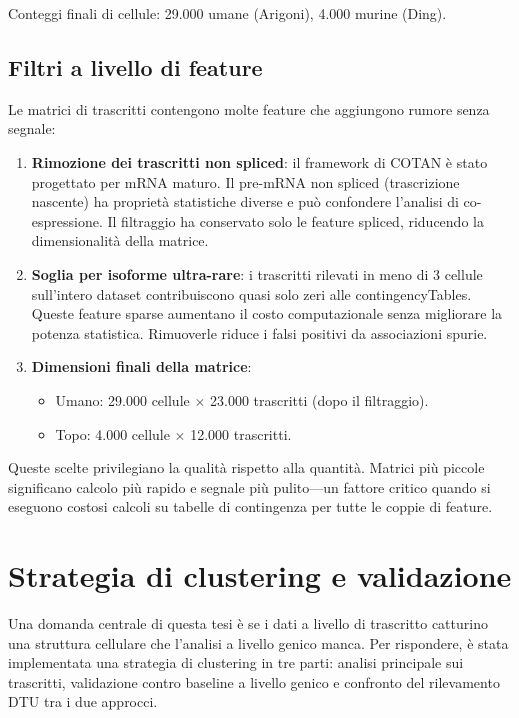 Conteggi finali di cellule: 29.000 umane (Arigoni), 4.000 murine (Ding).

\subsection*{Filtri a livello di feature}

Le matrici di trascritti contengono molte feature che aggiungono rumore senza segnale:

\begin{enumerate}
    \item \textbf{Rimozione dei trascritti non spliced}: il framework di COTAN è stato progettato per mRNA maturo. Il pre-mRNA non spliced (trascrizione nascente) ha proprietà statistiche diverse e può confondere l'analisi di co-espressione. Il filtraggio ha conservato solo le feature spliced, riducendo la dimensionalità della matrice.
    \item \textbf{Soglia per isoforme ultra-rare}: i trascritti rilevati in meno di 3 cellule sull'intero dataset contribuiscono quasi solo zeri alle \glspl{contingencyTable}. Queste feature sparse aumentano il costo computazionale senza migliorare la potenza statistica. Rimuoverle riduce i falsi positivi da associazioni spurie.
    \item \textbf{Dimensioni finali della matrice}:
    \begin{itemize}
        \item Umano: 29.000 cellule $\times$ 23.000 trascritti (dopo il filtraggio).
        \item Topo: 4.000 cellule $\times$ 12.000 trascritti.
    \end{itemize}
\end{enumerate}

Queste scelte privilegiano la qualità rispetto alla quantità. Matrici più piccole significano calcolo più rapido e segnale più pulito---un fattore critico quando si eseguono costosi calcoli su tabelle di contingenza per tutte le coppie di feature.

\section{Strategia di clustering e validazione}

Una domanda centrale di questa tesi è se i dati a livello di trascritto catturino una struttura cellulare che l'analisi a livello genico manca. Per rispondere, è stata implementata una strategia di clustering in tre parti: analisi principale sui trascritti, validazione contro baseline a livello genico e confronto del rilevamento DTU tra i due approcci.

